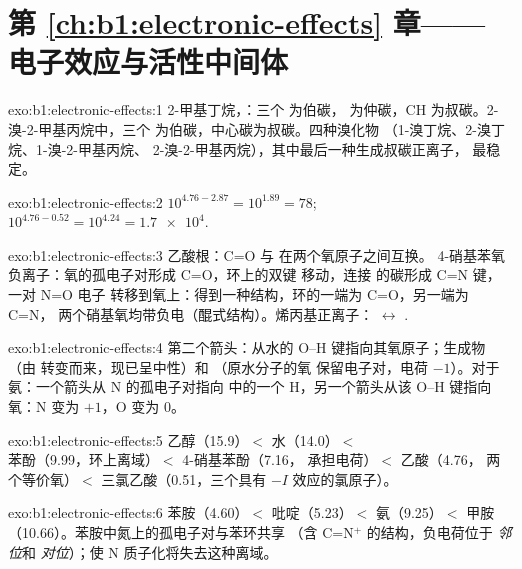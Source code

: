 \section*{第 \ref{ch:b1:electronic-effects} 章——电子效应与活性中间体}

\begin{solution}{exo:b1:electronic-effects:1}
2-甲基丁烷，：三个  为伯碳，
 为仲碳，CH 为叔碳。2-溴-2-甲基丙烷中，三个
 为伯碳，中心碳为叔碳。四种溴化物
（1-溴丁烷、2-溴丁烷、1-溴-2-甲基丙烷、
2-溴-2-甲基丙烷），其中最后一种生成叔碳正离子，
最稳定。
\end{solution}

\begin{solution}{exo:b1:electronic-effects:2}
$10^{4.76 - 2.87} = 10^{1.89} = 78$; $10^{4.76 - 0.52} = 10^{4.24} =
\num{1.7e4}$.
\end{solution}

\begin{solution}{exo:b1:electronic-effects:3}
乙酸根：C=O 与  在两个氧原子之间互换。
4-硝基苯氧负离子：氧的孤电子对形成 C=O，环上的双键
移动，连接  的碳形成 C=N 键，一对 N=O 电子
转移到氧上：得到一种结构，环的一端为 C=O，另一端为 C=N，
两个硝基氧均带负电（醌式结构）。烯丙基正离子：
 $\leftrightarrow$ .
\end{solution}

\begin{solution}{exo:b1:electronic-effects:4}
第二个箭头：从水的 O--H 键指向其氧原子；生成物 
（由  转变而来，现已呈中性）和 （原水分子的氧
保留电子对，电荷 $-1$）。对于氨：一个箭头从 N 的孤电子对指向
 中的一个 H，另一个箭头从该 O--H 键指向氧：N 变为
$+1$，O 变为 0。
\end{solution}

\begin{solution}{exo:b1:electronic-effects:5}
乙醇（15.9）$<$ 水（14.0）$<$ 苯酚（9.99，环上离域）$<$
4-硝基苯酚（7.16， 承担电荷）$<$ 乙酸（4.76，
两个等价氧）$<$ 三氯乙酸（0.51，三个具有 $-I$
效应的氯原子）。
\end{solution}

\begin{solution}{exo:b1:electronic-effects:6}
苯胺（4.60）$<$ 吡啶（5.23）$<$ 氨（9.25）$<$ 甲胺
（10.66）。苯胺中氮上的孤电子对与苯环共享
（含 C=N$^+$ 的结构，负电荷位于 \textit{邻位}和
\textit{对位}）；使 N 质子化将失去这种离域。
\end{solution}

